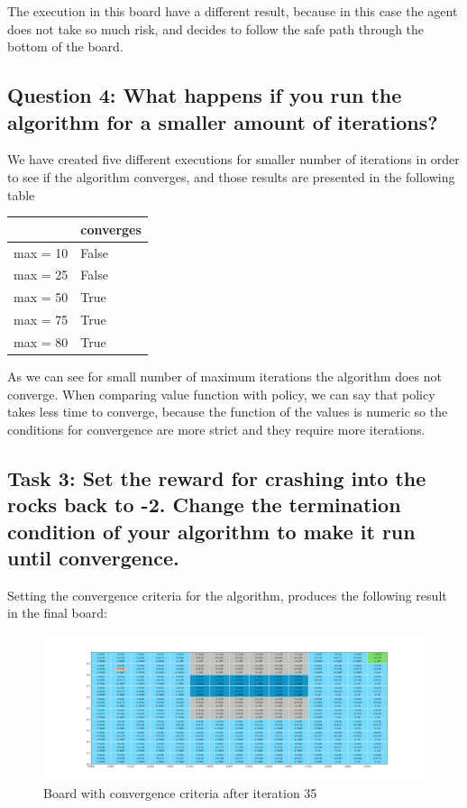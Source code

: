 \documentclass[12pt]{article}
\begin{document}
The execution in this board have a different result, because in this case the agent does not take so much risk, and decides to follow the safe path through the bottom of the board. 

\subsection{Question 4: What happens if you run the algorithm for a smaller amount of iterations?}

We have created five different executions for smaller number of iterations in order to see if the algorithm converges, and those results are presented in the following table

\begin{table}[h]
\centering
\begin{tabular}{l|l}
         & converges \\ \hline
max = 10 & False     \\
max = 25 & False     \\
max = 50 & True      \\
max = 75 & True      \\
max = 80 & True     
\end{tabular}
\end{table}

As we can see for small number of maximum iterations the algorithm does not converge. When comparing value function with policy, we can say that policy takes less time to converge, because the function of the values is numeric so the conditions for convergence are more strict and they require more iterations.

\subsection{Task 3: Set the reward for crashing into the rocks back to -2. Change the termination condition of your algorithm to make it run until convergence.}

Setting the convergence criteria for the algorithm, produces the following result in the final board:

\begin{figure}[H]
    \centering
    \includegraphics[scale=0.25]{exercise-2/report/img/final-board-with-threshold.png}
    \caption{Board with convergence criteria after iteration 35}
    \label{fig:pol-final-board}
\end{figure}
\end{document}
